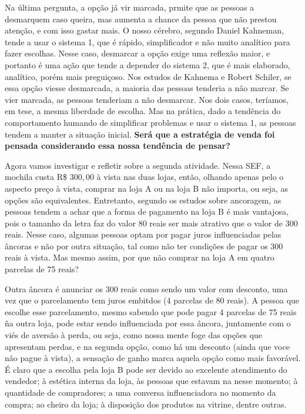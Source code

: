 Na última pergunta, a opção já vir marcada, prmite que as pessoas a desmarquem caso queira, mas aumenta a chance da pessoa que não prestou atenção, e com isso gastar mais. O nosso cérebro, segundo Daniel Kahneman, tende a usar o sistema 1, que é rápido, simplificador e não muito analítico para fazer escolhas. Nesse caso, desmarcar a opção exige uma reflexão maior, e portanto é uma ação que tende a depender do sistema 2, que é mais elaborado, analítico, porém mais preguiçoso. Nos estudos de Kahnema e Robert Schiler, se essa opção viesse desmarcada, a maioria das pessoas tenderia a não marcar. Se vier marcada, as pessoas tenderiam a não desmarcar. Nos dois casos, teríamos, em tese, a mesma liberdade de escolha. Mas na prática, dado a tendência do comportamento humando de simplificar problemas e usar o sistema 1, as pessoas tendem a manter a situação inicial. \textbf{Será que a estratégia de venda foi pensada considerando essa nossa tendência de pensar?}

Agora vamos investigar e refletir sobre a segunda atividade. Nessa SEF, a mochila custa R\$ $300{,}00$ à vista nas duas lojas, então, olhando apenas pelo o aspecto preço à vista, comprar na loja A ou na loja B não importa, ou seja, as opções são equivalentes. Entretanto, segundo os estudos sobre ancoragem, as pessoas tendem a achar que a forma de pagamento na loja B é mais vantajosa, pois o tamanho da letra faz do valor 80 reais ser mais atrativo que o valor de 300 reais. Nesse caso, algumas pessoas optam por pagar juros influenciadas pelas âncoras e não por outra situação, tal como não ter condições de pagar os 300 reais à vista. Mas mesmo assim, por que não comprar na loja A em quatro parcelas de 75 reais?

Outra âncora é anunciar os 300 reais como sendo um valor com desconto, uma vez que o parcelamento tem juros embitdos (4 parcelas de 80 reais). A pessoa que escolhe esse parcelamento, mesmo sabendo que pode pagar 4 parcelas de 75 reais ña outra loja, pode estar sendo influenciada por essa âncora, juntamente com o viés de aversão à perda, ou seja, como nossa mente foge das opções que apresentam perdas, e na segunda opção, como há um desconto (ainda que voce não pague à vista), a sensação de ganho marca aquela opção como mais favorável. É claro que a escolha pela loja B pode ser devido ao excelente atendimento do vendedor; à estética interna da loja, às pessoas que estavam na nesse momento; à quantidade de compradores; a uma conversa influenciadora no momento da compra; ao cheiro da loja; à disposição dos produtos na vitrine, dentre outras.

